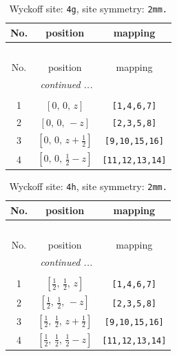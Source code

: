 \documentclass[fleqn,8pt]{jsarticle}
\begin{document}
\begin{longtable}{ccc}
\caption{Wyckoff site: {\tt 4g}, site symmetry: {\tt 2mm.}}
 \\
 \hline \hline
No. & position & mapping \\ \hline \endfirsthead

\multicolumn{2}{l}{\tablename\ \thetable{}} \\
 \hline \hline
No. & position & mapping \\ \hline \endhead

 \hline \hline
\multicolumn{2}{r}{\footnotesize\it continued ...} \\ \endfoot

 \hline \hline
\multicolumn{2}{r}{} \\ \endlastfoot

1 & $\left[ 0,\, 0,\, z \right]$ & {\tt [1,4,6,7]} \\ \hline
2 & $\left[ 0,\, 0,\, - z \right]$ & {\tt [2,3,5,8]} \\ \hline
3 & $\left[ 0,\, 0,\, z + \frac{1}{2} \right]$ & {\tt [9,10,15,16]} \\ \hline
4 & $\left[ 0,\, 0,\, \frac{1}{2} - z \right]$ & {\tt [11,12,13,14]} \\
\end{longtable}
\renewcommand{\arraystretch}{1.2}
\begin{longtable}{ccc}
\caption{Wyckoff site: {\tt 4h}, site symmetry: {\tt 2mm.}}
 \\
 \hline \hline
No. & position & mapping \\ \hline \endfirsthead

\multicolumn{2}{l}{\tablename\ \thetable{}} \\
 \hline \hline
No. & position & mapping \\ \hline \endhead

 \hline \hline
\multicolumn{2}{r}{\footnotesize\it continued ...} \\ \endfoot

 \hline \hline
\multicolumn{2}{r}{} \\ \endlastfoot

1 & $\left[ \frac{1}{2},\, \frac{1}{2},\, z \right]$ & {\tt [1,4,6,7]} \\ \hline
2 & $\left[ \frac{1}{2},\, \frac{1}{2},\, - z \right]$ & {\tt [2,3,5,8]} \\ \hline
3 & $\left[ \frac{1}{2},\, \frac{1}{2},\, z + \frac{1}{2} \right]$ & {\tt [9,10,15,16]} \\ \hline
4 & $\left[ \frac{1}{2},\, \frac{1}{2},\, \frac{1}{2} - z \right]$ & {\tt [11,12,13,14]} \\
\end{longtable}
\end{document}
